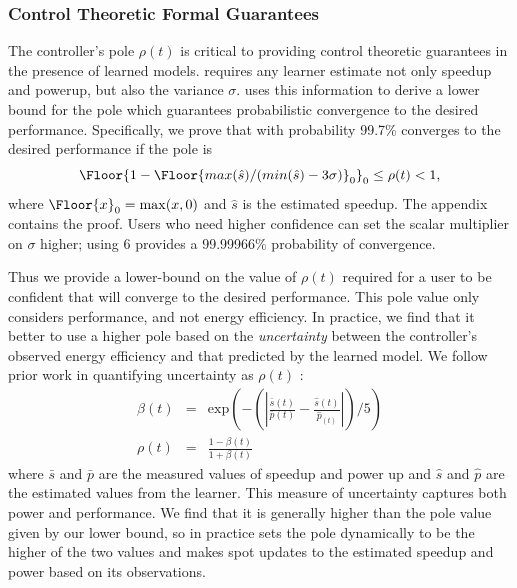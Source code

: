 \subsubsection{Control Theoretic Formal Guarantees}
\label{sec:guarantees}
The controller's pole $\rho(t)$ is critical to providing control
theoretic guarantees in the presence of learned models.  \SYSTEM{}
requires any learner estimate not only speedup and powerup, but also
the variance $\sigma$.  \SYSTEM{} uses this information to derive a
lower bound for the pole which guarantees probabilistic convergence to
the desired performance. Specifically, we prove that with probability
99.7\% \SYSTEM{} converges to the desired performance if the pole is
$$\Floor{1- \Floor{max(\hat{s})/(min(\hat{s}) - 3\sigma)}_0}_0 \leq \rho(t)
< 1,$$ where $\Floor{x}_0 = \max(x,0)$ and $\hat{s}$ is the estimated
speedup. The appendix contains the proof. Users who need higher
confidence can set the scalar multiplier on $\sigma$ higher; \eg{}
using $6$ provides a 99.99966\% probability of convergence.

Thus we provide a lower-bound on the value of $\rho(t)$ required for a
user to be confident that \SYSTEM{} will converge to the desired
performance.  This pole value only considers performance, and not
energy efficiency.  In practice, we find that it better to use a
higher pole based on the \emph{uncertainty} between the controller's
observed energy efficiency and that predicted by the learned model.
We follow prior work in quantifying uncertainty as $\rho(t) $
\cite{Tokic2010}:
\begin{equation}
  \begin{array}{rcl}
    \beta(t) &=&  \text{exp}{\left(- \left( \left|   \frac{\bar{s}(t)}{\bar{p}(t)}  -\frac{ \hat{s}(t)}{\hat{p}_(t)} \right| \right) /5\right)} \\
    \rho(t) &=& \frac{1-\beta(t)}{1+\beta(t)} 
  \end{array}
  \label{eqn:uncer}
\end{equation}
where $\bar{s}$ and $\bar{p}$ are the measured values of speedup and
power up and $\hat{s}$ and $\hat{p}$ are the estimated values from the
learner.  This measure of uncertainty captures both power and
performance.  We find that it is generally higher than the pole value
given by our lower bound, so in practice \SYSTEM{} sets the pole
dynamically to be the higher of the two values and \SYSTEM{} makes
spot updates to the estimated speedup and power based on its
observations.
